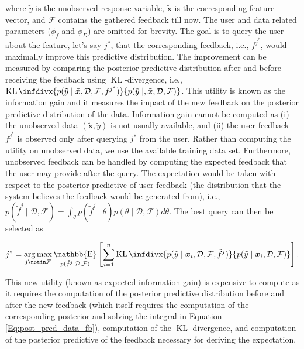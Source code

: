 \documentclass[dissertation,math,vertlayout,pdfa,colorlinks]{aaltoseries}
\newcommand{\bD}{\mathcal{D}}
\newcommand{\bF}{\mathcal{F}}
\DeclareMathOperator{\KLt}{KL}
\newcommand{\KL}{\KLt\infdivx}
\DeclareMathOperator{\E}{\mathbb{E}}
\DeclareMathOperator*{\argmax}{arg\,max}
\begin{document}
\noindent where $\tilde{y}$ is the unobserved response variable,  $\tilde{\bm{x}}$ is the corresponding feature vector, and $\bF$ contains the gathered feedback till now. The user and data related parameters ($\phi_f$ and $\phi_D$) are omitted for brevity. The goal is to query the user about the feature, let's say $j^*$, that the corresponding feedback, i.e., $f^{j^*}$, would maximally improve this predictive distribution. The improvement can be measured by comparing the posterior predictive distribution after and before receiving the feedback using $\KLt$-divergence, i.e., $\KL{p(\tilde{y} \mid \tilde{\bm{x}}, \bD,\bF,f^{j^*})} {p(\tilde{y} \mid, \tilde{\bm{x}}, \bD,\bF)}$. This utility is known as the information gain and it measures the impact of the new feedback on the posterior predictive distribution of the data. Information gain cannot be computed as (i) the unobserved data $(\tilde{\bm{x}},\tilde{y})$ is not usually available, and (ii) the user feedback $f^{j^*}$ is observed only after querying $j^*$ from the user. Rather than computing the utility on unobserved data, we use the available training data set. Furthermore, unobserved feedback can be handled by computing the expected feedback that the user may provide after the query. The expectation would be taken with respect to the posterior predictive of user feedback (the distribution that the system believes the feedback would be generated from), i.e., $p(\tilde{f}^j \mid \bD,\bF)= \int_{\theta} p(\tilde{f}^j \mid \theta)p(\theta \mid \bD, \bF)d\theta$. The best query can then be  selected as

\begin{equation}\label{Eq:expected_info_gain}
j^* = \argmax_{j \notin \bF} \E_{p(\tilde{f}^j \mid \bD,\bF)} \left[ \sum_{i=1}^{n}  \KL{p(\tilde{y}\mid \bm{x}_i, \bD,\bF,\tilde{f}^j)} {p(\tilde{y} \mid \bm{x}_i, \bD,\bF)} \right].
\end{equation}
    
This new utility (known as expected information gain) is expensive to compute as it requires the computation of the posterior predictive distribution before and after the new feedback (which itself requires the computation of the corresponding posterior and solving the integral in Equation \ref{Eq:post_pred_data_fb}), computation of the $\KLt$-divergence, and computation of the posterior predictive of the feedback necessary for deriving the expectation. 
\end{document}
